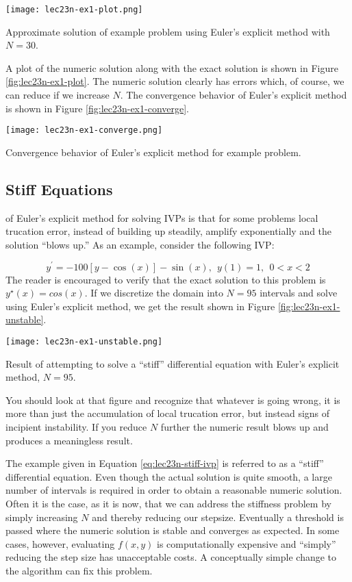 \begin{marginfigure}[-5.0cm]
\texttt{[image: lec23n-ex1-plot.png]}
\caption{Approximate solution of example problem using Euler's explicit method with $N=30$.}
\label{fig:lec23n-ex1-plot}
\end{marginfigure}
A plot of the numeric solution along with the exact solution is shown in Figure \ref{fig:lec23n-ex1-plot}. The numeric solution clearly has errors which, of course, we can reduce if we increase $N$.  The convergence behavior of Euler's explicit method is shown in Figure \ref{fig:lec23n-ex1-converge}.
\begin{marginfigure}[-0.20cm]
\texttt{[image: lec23n-ex1-converge.png]}
\caption{Convergence behavior of Euler's explicit method for example problem.}
\label{fig:lec23n-ex1-converge}
\end{marginfigure}

\subsection{Stiff Equations}

 of Euler's explicit method for solving IVPs is that for some problems local trucation error, instead of building up steadily, amplify exponentially and the solution ``blows up.''  As an example, consider the following IVP:

\begin{equation}
y^{\prime} = -100[y-\cos{(x)}]- \sin{(x)}, \ \ y(1) = 1, \ \ 0<x<2
\label{eq:lec23n-stiff-ivp}
\end{equation}
The reader is encouraged to verify that the exact solution to this problem is $y^{\star}(x)=cos{(x)}$.  If we discretize the domain into $N=95$ intervals and solve using Euler's explicit method, we get the result shown in Figure \ref{fig:lec23n-ex1-unstable}.
\begin{marginfigure}
\texttt{[image: lec23n-ex1-unstable.png]}
\caption{Result of attempting to solve a ``stiff'' differential equation with Euler's explicit method, $N=95$.}
\label{fig:lec23n-ex1-unstable}
\end{marginfigure}
You should look at that figure and recognize that whatever is going wrong, it is more than just the accumulation of local trucation error, but instead signs of incipient instability.  If you reduce $N$ further the numeric result blows up and produces a meaningless result.

The example given in Equation \ref{eq:lec23n-stiff-ivp} is referred to as a ``stiff'' differential equation.  Even though the actual solution is quite smooth, a large number of intervals is required in order to obtain a reasonable numeric solution.  Often it is the case, as it is now, that we can address the stiffness problem by simply increasing $N$ and thereby reducing our stepsize.  Eventually a threshold is passed where the numeric solution is stable and converges as expected.  In some cases, however, evaluating $f(x,y)$ is computationally expensive and ``simply'' reducing the step size has unacceptable costs.  A conceptually simple change to the algorithm can fix this problem.

